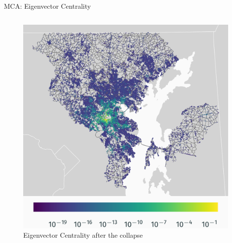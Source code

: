 \documentclass{beamer}
\numberwithin{figure}{section} %
\numberwithin{table}{section} %
\begin{document}
\begin{frame}{MCA: Eigenvector Centrality}
\begin{columns}
        \begin{column}{0.33\textwidth}
            \begin{figure}
                \centering
                \includegraphics[width=\textwidth]{maps/eigenvector_wo_bridge.png}
                {\scriptsize Eigenvector Centrality after the collapse}
            \end{figure}
        \end{column}


\end{columns}
\end{frame}
\end{document}
